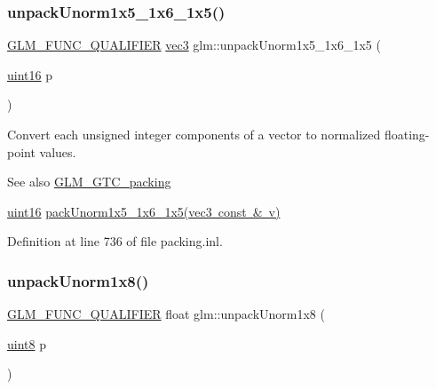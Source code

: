 \mbox{\label{group__gtc__packing_ga6804d0525daf68bcac226f46fbb3b24e}} 
\subsubsection{\texorpdfstring{unpackUnorm1x5\_1x6\_1x5()}{unpackUnorm1x5\_1x6\_1x5()}}
{\footnotesize\ttfamily \mbox{\hyperlink{setup_8hpp_a33fdea6f91c5f834105f7415e2a64407}{G\+L\+M\+\_\+\+F\+U\+N\+C\+\_\+\+Q\+U\+A\+L\+I\+F\+I\+ER}} \mbox{\hyperlink{group__core__types_ga1c47e8b3386109bc992b6c48e91b0be7}{vec3}} glm\+::unpack\+Unorm1x5\+\_\+1x6\+\_\+1x5 (\begin{DoxyParamCaption}\item[{\mbox{\hyperlink{group__gtc__type__precision_gad8c2939e1fdd8e5828b31d95c52255d5}{uint16}}}]{p }\end{DoxyParamCaption})}

Convert each unsigned integer components of a vector to normalized floating-\/point values.

\begin{DoxySeeAlso}{See also}
\mbox{\hyperlink{group__gtc__packing}{G\+L\+M\+\_\+\+G\+T\+C\+\_\+packing}} 

\mbox{\hyperlink{group__gtc__type__precision_gad8c2939e1fdd8e5828b31d95c52255d5}{uint16}} \mbox{\hyperlink{group__gtc__packing_ga0fcb493167d540aca105d11df5c55503}{pack\+Unorm1x5\+\_\+1x6\+\_\+1x5(vec3 const \& v)}} 
\end{DoxySeeAlso}


Definition at line 736 of file packing.\+inl.

\mbox{\label{group__gtc__packing_ga32f3f2642df2ea87449d59fb614a8305}} 
\subsubsection{\texorpdfstring{unpackUnorm1x8()}{unpackUnorm1x8()}}
{\footnotesize\ttfamily \mbox{\hyperlink{setup_8hpp_a33fdea6f91c5f834105f7415e2a64407}{G\+L\+M\+\_\+\+F\+U\+N\+C\+\_\+\+Q\+U\+A\+L\+I\+F\+I\+ER}} float glm\+::unpack\+Unorm1x8 (\begin{DoxyParamCaption}\item[{\mbox{\hyperlink{group__gtc__type__precision_ga1a7dcd8aac97cc8020817c94049deff2}{uint8}}}]{p }\end{DoxyParamCaption})}

